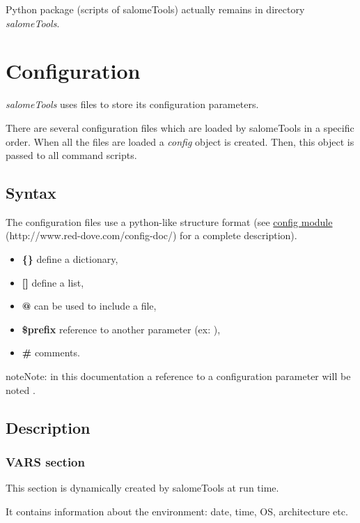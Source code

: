 \documentclass[a4paper,10pt,english]{sphinxmanual}
\begin{document}
Python package (scripts of salomeTools) actually remains in directory \emph{salomeTools}.


\section{Configuration}
\label{configuration:configuration}\label{configuration::doc}
\emph{salomeTools} uses files to store its configuration parameters.

There are several configuration files which are loaded by salomeTools in a specific order.
When all the files are loaded a \emph{config} object is created.
Then, this object is passed to all command scripts.


\subsection{Syntax}
\label{configuration:syntax}
The configuration files use a python-like structure format
(see \href{http://www.red-dove.com/config-doc/}{config module} (http://www.red-dove.com/config-doc/) for a complete description).
\begin{itemize}
\item {} 
\textbf{\{\}} define a dictionary,

\item {} 
\textbf{{[}{]}} define a list,

\item {} 
\textbf{@} can be used to include a file,

\item {} 
\textbf{\$prefix} reference to another parameter (ex: ),

\item {} 
\textbf{\#} comments.

\end{itemize}

\begin{notice}{note}{Note:}
in this documentation a reference to a configuration parameter will be noted .
\end{notice}


\subsection{Description}
\label{configuration:description}

\subsubsection{VARS section}
\label{configuration:vars-section}\label{configuration:id1}
\begin{DUlineblock}{0em}
\item[] This section is dynamically created by salomeTools at run time.
\item[] It contains information about the environment: date, time, OS, architecture etc.
\end{DUlineblock}
\end{document}
